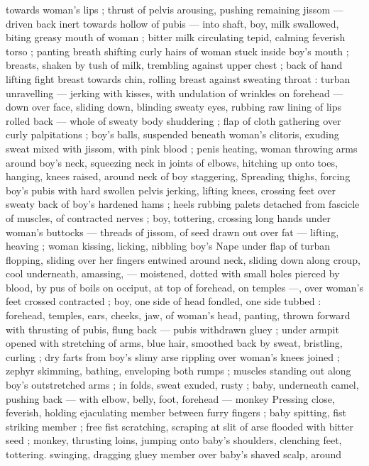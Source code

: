 towards woman's lips ; thrust of pelvis arousing, pushing remaining 
jissom --- driven back inert towards hollow of pubis --- into shaft, 
boy, milk swallowed, biting greasy mouth of woman ; bitter milk 
circulating tepid, calming feverish torso ; panting breath shifting 
curly hairs of woman stuck inside boy's mouth ; breasts, shaken by 
tush of milk, trembling against upper chest ; back of hand lifting 
fight breast towards chin, rolling breast against sweating throat : 
turban unravelling --- jerking with kisses, with undulation of wrinkles 
on forehead --- down over face, sliding down, blinding sweaty eyes, 
rubbing raw lining of lips rolled back --- whole of sweaty body 
shuddering ; flap of cloth gathering over curly palpitations ; boy's 
balls, suspended beneath woman's clitoris, exuding sweat mixed with 
jissom, with pink blood ; penis heating, woman throwing arms around 
boy's neck, squeezing neck in joints of elbows, hitching up onto 
toes, hanging, knees raised, around neck of boy staggering, 
Spreading thighs, forcing boy's pubis with hard swollen pelvis 
jerking, lifting knees, crossing feet over sweaty back of boy's 
hardened hams ; heels rubbing palets detached from fascicle of 
muscles, of contracted nerves ; boy, tottering, crossing long hands 
under woman's buttocks --- threads of jissom, of seed drawn out 
over fat --- lifting, heaving ; woman kissing, licking, nibbling boy's 
Nape under flap of turban flopping, sliding over her fingers entwined 
around neck, sliding down along croup, cool underneath, amassing, 
--- moistened, dotted with small holes pierced by blood, by pus of 
boils on occiput, at top of forehead, on temples ---, over woman's 
feet crossed contracted ; boy, one side of head fondled, one side 
tubbed : forehead, temples, ears, cheeks, jaw, of woman's head, 
panting, thrown forward with thrusting of pubis, flung back --- pubis 
withdrawn gluey ; under armpit opened with stretching of arms, blue 
hair, smoothed back by sweat, bristling, curling ; dry farts from boy's 
slimy arse rippling over woman's knees joined ; zephyr skimming, 
bathing, enveloping both rumps ; muscles standing out along boy's 
outstretched arms ; in folds, sweat exuded, rusty ; baby, underneath 
camel, pushing back --- with elbow, belly, foot, forehead --- monkey 
Pressing close, feverish, holding ejaculating member between furry 
fingers ; baby spitting, fist striking member ; free fist scratching, 
scraping at slit of arse flooded with bitter seed ; monkey, thrusting 
loins, jumping onto baby's shoulders, clenching feet, tottering. 
swinging, dragging gluey member over baby's shaved scalp, around 
